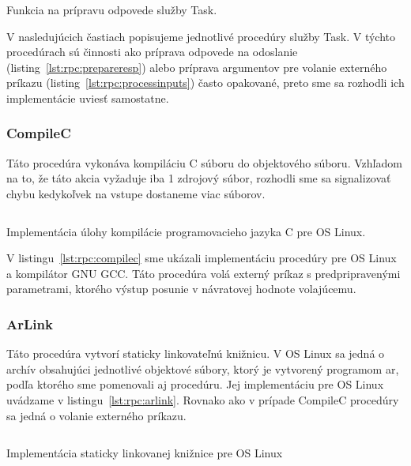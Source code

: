 \begin{listing}[H]
  \inputminted[frame=lines,framesep=2mm,linenos,fontsize=\scriptsize,firstline=24,lastline=40]{go}{/home/pepol/src/imterra/forge/worker/tasks/util.go}
  \caption{Funkcia na prípravu odpovede služby Task.}
  \label{lst:rpc:prepareresp}
\end{listing}

V nasledujúcich častiach popisujeme jednotlivé procedúry služby Task. V týchto
procedúrach sú činnosti ako príprava odpovede na odoslanie (listing~\ref{lst:rpc:prepareresp})
alebo príprava argumentov pre volanie externého príkazu (listing~\ref{lst:rpc:processinputs})
často opakované, preto sme sa rozhodli ich implementácie uviesť samostatne.

\subsubsection{CompileC}

Táto procedúra vykonáva kompiláciu C súboru do objektového súboru. Vzhľadom na to,
že táto akcia vyžaduje iba 1 zdrojový súbor, rozhodli sme sa signalizovať chybu
kedykoľvek na vstupe dostaneme viac súborov.

\begin{listing}[H]
  \inputminted[frame=lines,framesep=2mm,linenos,fontsize=\scriptsize,firstline=20,lastline=47]{go}{/home/pepol/src/imterra/forge/worker/tasks/tasks.go}
  \caption[Implementácia kompilácie jazyka C]{Implementácia úlohy kompilácie programovacieho jazyka C pre OS Linux.}
  \label{lst:rpc:compilec}
\end{listing}

V listingu~\ref{lst:rpc:compilec} sme ukázali implementáciu procedúry pre OS Linux
a kompilátor GNU GCC\@. Táto procedúra volá externý príkaz s predpripravenými parametrami,
ktorého výstup posunie v návratovej hodnote volajúcemu.

\subsubsection{ArLink}

Táto procedúra vytvorí staticky linkovateľnú knižnicu. V OS Linux sa jedná o archív
obsahujúci jednotlivé objektové súbory, ktorý je vytvorený programom ar, podľa ktorého
sme pomenovali aj procedúru. Jej implementáciu pre OS Linux uvádzame v listingu~\ref{lst:rpc:arlink}.
Rovnako ako v prípade CompileC procedúry sa jedná o volanie externého príkazu.

\begin{listing}[H]
  \inputminted[frame=lines,framesep=2mm,linenos,fontsize=\scriptsize,firstline=49,lastline=72]{go}{/home/pepol/src/imterra/forge/worker/tasks/tasks.go}
  \caption{Implementácia staticky linkovanej knižnice pre OS Linux}
  \label{lst:rpc:arlink}
\end{listing}

